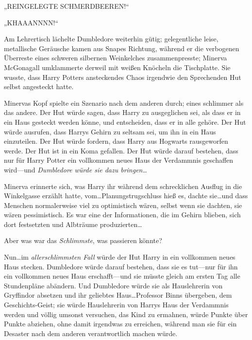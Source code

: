 \later

„\uppercase{Reingelegte Schmerdbeeren!}“%

\later

„KHAAANNNN!“%

\later

Am Lehrertisch lächelte Dumbledore weiterhin gütig; gelegentliche leise, metallische Geräusche kamen aus Snapes Richtung, während er die verbogenen Überreste eines schweren silbernen Weinkelches zusammenpresste; Minerva McGonagall umklammerte derweil mit weißen Knöcheln die Tischplatte. Sie wusste, dass Harry Potters ansteckendes Chaos irgendwie den Sprechenden Hut selbst angesteckt hatte.

Minervas Kopf spielte ein Szenario nach dem anderen durch; eines schlimmer als das andere. Der Hut würde sagen, dass Harry zu ausgeglichen sei, als dass er in ein Haus gesteckt werden könne, und entscheiden, dass er in alle gehöre. Der Hut würde ausrufen, dass Harrys Gehirn zu seltsam sei, um ihn in ein Haus einzuteilen. Der Hut würde fordern, dass Harry aus Hogwarts rausgeworfen werde. Der Hut ist in ein Koma gefallen. Der Hut würde darauf bestehen, dass nur für Harry Potter ein vollkommen neues Haus der Verdammnis geschaffen wird—und \emph{Dumbledore würde sie dazu bringen…}

Minerva erinnerte sich, was Harry ihr während dem schrecklichen Ausflug in die Winkelgasse erzählt hatte, vom…Planungstrugschluss hieß es, dachte sie…und dass Menschen normalerweise viel zu optimistisch wären, selbst wenn sie dachten, sie wären pessimistisch. Es war eine der Informationen, die im Gehirn blieben, sich dort festsetzten und Albträume produzierten…

Aber was war das \emph{Schlimmste}, was passieren könnte?

Nun…im \emph{allerschlimmsten Fall} würde der Hut Harry in ein vollkommen neues Haus stecken. Dumbledore würde darauf bestehen, dass sie es tut—nur für ihn ein vollkommen neues Haus erschafft—und sie müsste gleich am ersten Tag alle Stundenpläne abändern. Und Dumbledore würde sie als Hauslehrerin von Gryffindor absetzen und ihr geliebtes Haus…Professor Binns übergeben, dem Geschichts-Geist; sie würde Hauslehrerin von Harrys Haus der Verdammnis werden und völlig umsonst versuchen, das Kind zu ermahnen, würde Punkte über Punkte abziehen, ohne damit irgendwas zu erreichen, während man sie für ein Desaster nach dem anderen verantwortlich machen würde.

